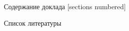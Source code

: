\documentclass[notheorems, aspectratio=169]{beamer}
\date{8--13 сентября 2025 г.}
\theoremstyle{named}
\begin{document}



\begin{frame}{Содержание доклада}
    [sections numbered]
    \tableofcontents%
\end{frame}





\begin{frame}[allowframebreaks]{Список литературы}
    \printbibliography
\end{frame}
\end{document}
